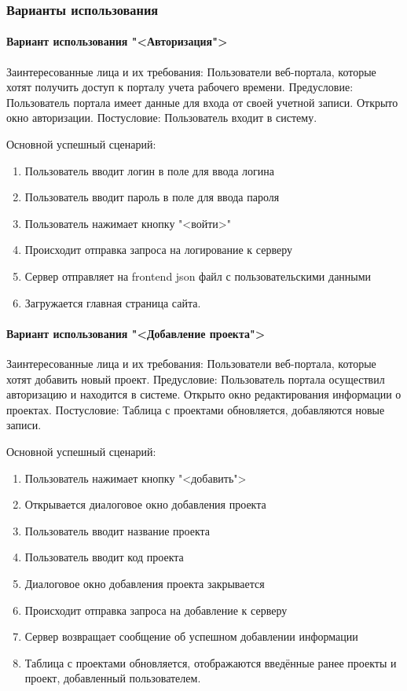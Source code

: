 \subsubsection{Варианты использования}
\paragraph{Вариант использования "<Авторизация">}
Заинтересованные лица и их требования: Пользователи веб-портала, которые хотят получить доступ к порталу учета рабочего времени.
Предусловие: Пользователь портала имеет данные для входа от своей учетной записи. Открыто окно авторизации.
Постусловие: Пользователь входит в систему.

Основной успешный сценарий:
\begin{enumerate}
	\item Пользователь вводит логин в поле для ввода логина
	\item Пользователь вводит пароль в поле для ввода пароля
	\item Пользователь нажимает кнопку "<войти>"
	\item Происходит отправка запроса на логирование к серверу 
	\item Сервер отправляет на frontend json файл с пользовательскими данными
	\item Загружается главная страница сайта.
\end{enumerate}

\paragraph{Вариант использования "<Добавление проекта">}
Заинтересованные лица и их требования: Пользователи веб-портала, которые хотят добавить новый проект.
Предусловие: Пользователь портала осуществил авторизацию и находится в системе. Открыто окно редактирования информации о проектах.
Постусловие: Таблица с проектами обновляется, добавляются новые записи.

Основной успешный сценарий:
\begin{enumerate}
	\item Пользователь нажимает кнопку "<добавить">
	\item Открывается диалоговое окно добавления проекта
	\item Пользователь вводит название проекта
	\item Пользователь вводит код проекта
	\item Диалоговое окно добавления проекта закрывается
	\item Происходит отправка запроса на добавление к серверу 
	\item Сервер возвращает сообщение об успешном добавлении информации
	\item Таблица с проектами обновляется, отображаются введённые ранее проекты и проект, добавленный пользователем.
\end{enumerate}

